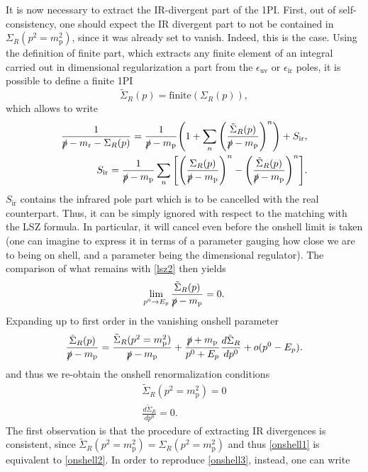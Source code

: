 \documentclass[11pt]{article}
\begin{document}
It is now necessary to extract the IR-divergent part of the 1PI. First, out of self-consistency, one should expect the IR divergent part to not be contained in $\Sigma_R(p^2=m_\text{p}^2)$, since it was already set to vanish. Indeed, this is the case. Using the definition of finite part, which extracts any finite element of an integral carried out in dimensional regularization a part from the $\epsilon_{\text{uv}}$ or $\epsilon_{\text{ir}}$ poles, it is possible to define a finite 1PI
\begin{equation}
\tilde\Sigma_R(p)=\text{finite}(\Sigma_R(p)),
\end{equation} 
which allows to write
\begin{align}
\frac{1}{\slashed p -m_\text{r}-\Sigma_R(p)}=\frac{1}{\slashed p -m_\text{p}}\Bigg(1+\sum_n \Bigg(\frac{\tilde\Sigma_R(p)}{\slashed p -m_\text{p}}\Bigg)^n\Bigg)+S_{\text{ir}}, \\
S_{\text{ir}}=\frac{1}{\slashed p -m_\text{p}}\sum_n \Bigg[\Bigg(\frac{\Sigma_R(p)}{\slashed p -m_\text{p}}\Bigg)^n-\Bigg(\frac{\tilde\Sigma_R(p)}{\slashed p -m_\text{p}}\Bigg)^n\Bigg].
\end{align}
$S_{\text{ir}}$ contains the infrared pole part which is to be cancelled with the real counterpart. Thus, it can be simply ignored with respect to the matching with the LSZ formula. In particular, it will cancel even before the onshell limit is taken (one can imagine to express it in terms of a parameter gauging how close we are to being on shell, and a parameter being the dimensional regulator). The comparison of what remains with \eqref{lsz2} then yields
\begin{equation}
\lim_{p^0\rightarrow E_p}\frac{\tilde\Sigma_R(p)}{\slashed p -m_\text{p}}=0.
\end{equation} 
Expanding up to first order in the vanishing onshell parameter
\begin{equation}
\frac{\tilde\Sigma_R(p)}{\slashed p -m_\text{p}}=\frac{\tilde\Sigma_R(p^2=m_\text{p}^2)}{\slashed p -m_\text{p}}+\frac{\slashed p +m_\text{p}}{p^0+E_p}\frac{d\tilde\Sigma_R}{dp^0}+o(p^0-E_p).
\end{equation} 
and thus we re-obtain the onshell renormalization conditions
\begin{align}\label{onshell2}
\tilde\Sigma_R(p^2=m_\text{p}^2)=0 \\ \label{onshell3}
\frac{d\tilde\Sigma_R}{dp^0}=0.
\end{align}
The first observation is that the procedure of extracting IR divergences is consistent, since $\tilde\Sigma_R(p^2=m_\text{p}^2)=\Sigma_R(p^2=m_\text{p}^2)$ and thus \eqref{onshell1} is equivalent to \eqref{onshell2}. In order to reproduce \eqref{onshell3}, instead, one can write
\end{document}
